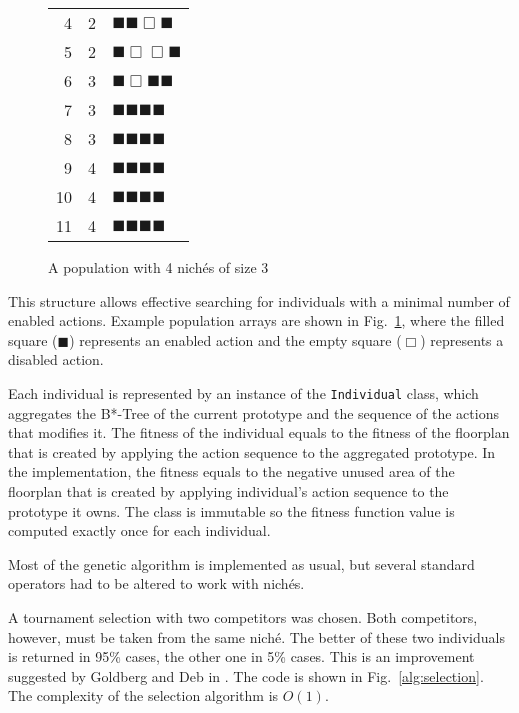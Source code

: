 \begin{figure}
{\begin{tabular}{|r|l|l|}
4 & 2 & $ \blacksquare \blacksquare \Box \blacksquare $ \\
5 & 2 & $ \blacksquare \Box \Box \blacksquare $ \\
\hline
6 & 3 & $ \blacksquare \Box \blacksquare \blacksquare $ \\
7 & 3 & $ \blacksquare \blacksquare \blacksquare \blacksquare $ \\
8 & 3 & $ \blacksquare \blacksquare \blacksquare \blacksquare $ \\
\hline
9 & 4 & $ \blacksquare \blacksquare \blacksquare \blacksquare $ \\
10 & 4 & $ \blacksquare \blacksquare \blacksquare \blacksquare $ \\
11 & 4 & $ \blacksquare \blacksquare \blacksquare \blacksquare $ \\
\hline
\end{tabular}
}
\caption{A population with 4 nichés of size 3}
\label{fig:population}
\end{figure}

This structure allows effective searching for individuals with a minimal number of enabled actions. Example population arrays are shown in Fig.~\ref{fig:population}, where the filled square ($\blacksquare$) represents an enabled action and the empty square ($\Box$) represents a disabled action.

Each individual is represented by an instance of the {\tt Individual} class, which aggregates the B*-Tree of the current prototype and the sequence of the actions that modifies it. The fitness of the individual equals to the fitness of the floorplan that is created by applying the action sequence to the aggregated prototype. In the implementation, the fitness equals to the negative unused area of the floorplan that is created by applying individual's action sequence to the prototype it owns. The class is immutable so the fitness function value is computed exactly once for each individual.

Most of the genetic algorithm is implemented as usual, but several standard operators had to be altered to work with nichés.

A tournament selection with two competitors was chosen. Both competitors, however, must be taken from the same niché. The better of these two individuals is returned in 95\% cases, the other one in 5\% cases. This is an improvement suggested by Goldberg and Deb in \cite{tournament}. The code is shown in Fig.~\ref{alg:selection}. The complexity of the selection algorithm is $O(1)$.

